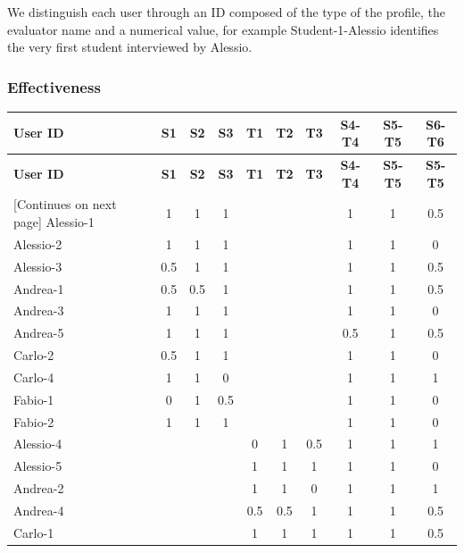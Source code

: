     We distinguish each user through an ID composed of the type of the profile, the evaluator name and a numerical value, for example Student-1-Alessio identifies the very first student interviewed by Alessio.
\subsubsection{Effectiveness}
    \begin{tabularx}{\linewidth}{l|c|c|c|c|c|c|c|c|c}
    \toprule
    \textbf{User ID} & \textbf{S1} & \textbf{S2} & \textbf{S3} & \textbf{T1} & \textbf{T2} & \textbf{T3} & \textbf{S4-T4} & \textbf{S5-T5} & \textbf{S6-T6} \\
    \midrule
    \endfirsthead
    \toprule
    \textbf{User ID} & \textbf{S1} & \textbf{S2} & \textbf{S3} & \textbf{T1} & \textbf{T2} & \textbf{T3} & \textbf{S4-T4} & \textbf{S5-T5} & \textbf{S5-T5} \\
    \midrule
    \endhead
    \midrule
    \footnotesize [Continues on next page]
    \endfoot
    \bottomrule
    \endlastfoot
        Alessio-1 & 1 & 1 & 1 &  &  &  & 1 & 1 & 0.5 \\ \midrule
        Alessio-2 & 1 & 1 & 1 &  &  &  & 1 & 1 & 0 \\ \midrule
        Alessio-3 & 0.5 & 1 & 1 &  &  &  & 1 & 1 & 0.5 \\ \midrule
        Andrea-1 & 0.5 & 0.5 & 1 &  &  &  & 1 & 1 & 0.5 \\ \midrule
        Andrea-3 & 1 & 1 & 1 &  &  &  & 1 & 1 & 0 \\ \midrule
        Andrea-5 & 1 & 1 & 1 &  &  &  & 0.5 & 1 & 0.5 \\ \midrule
        Carlo-2 & 0.5 & 1 & 1 &  &  &  & 1 & 1 & 0 \\ \midrule
        Carlo-4 & 1 & 1 & 0 &  &  &  & 1 & 1 & 1 \\ \midrule
        Fabio-1 & 0 & 1 & 0.5 &  &  &  & 1 & 1 & 0 \\ \midrule
        Fabio-2 & 1 & 1 & 1 &  &  &  & 1 & 1 & 0 \\ \midrule
        Alessio-4 &  &  &  & 0 & 1 & 0.5 & 1 & 1 & 1 \\ \midrule
        Alessio-5 &  &  &  & 1 & 1 & 1 & 1 & 1 & 0 \\ \midrule
        Andrea-2 &  &  &  & 1 & 1 & 0 & 1 & 1 & 1 \\ \midrule
        Andrea-4 &  &  &  & 0.5 & 0.5 & 1 & 1 & 1 & 0.5 \\ \midrule
        Carlo-1 &  &  &  & 1 & 1 & 1 & 1 & 1 & 0.5 \\ \midrule

\end{tabularx}
